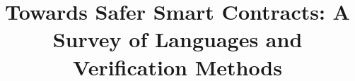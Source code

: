 \documentclass{llncs}
\begin{document}
\title{Towards Safer Smart Contracts: A Survey of Languages and Verification Methods}



\maketitle















\printbibliography
\end{document}

